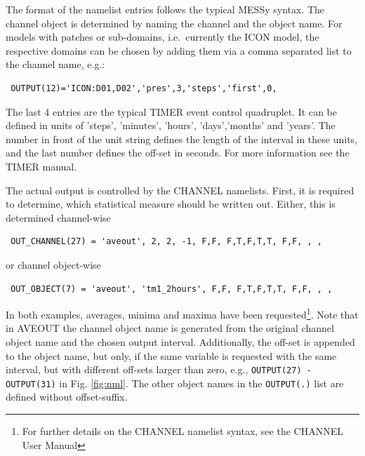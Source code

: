 \documentclass[twoside]{article}
\begin{document}
The format of the namelist entries follows the typical MESSy syntax. The
channel object is determined by naming the channel and the object name.
For  models with patches or sub-domains, i.e.\ currently the ICON model,
the respective domains can be chosen by adding them via a comma separated list
to the channel 
name, e.g.:
\begin{verbatim}
 OUTPUT(12)='ICON:D01,D02','pres',3,'steps','first',0,
\end{verbatim}

The last 4 entries are the typical TIMER event control quadruplet. It can be
defined in units of 'steps', 'minutes', 'hours', 'days','months' and
'years'. The number in front of the unit string defines the length of the
interval in these units, and the last number defines the off-set in
seconds. For more information see the TIMER manual.

The actual output is controlled by the CHANNEL namelists. First,
it is required to determine, which statistical measure should be written
out. Either, this is determined channel-wise
\begin{verbatim}
 OUT_CHANNEL(27) = 'aveout', 2, 2, -1, F,F, F,T,F,T,T, F,F, , ,
\end{verbatim}

or channel object-wise

\begin{verbatim}
 OUT_OBJECT(7) = 'aveout', 'tm1_2hours', F,F, F,T,F,T,T, F,F, , ,
\end{verbatim}

 In both examples, averages, minima and maxima have been
 requested\footnote{For further details on the CHANNEL namelist syntax, see the
 CHANNEL User Manual}. Note that in AVEOUT the channel object name is
 generated from the original channel object name and the chosen output
 interval. Additionally, the off-set is appended to the object name,
 but only, if the same variable is requested with the same interval, but with 
 different off-sets larger than zero, e.g., \verb|OUTPUT(27) - OUTPUT(31)| in
 Fig. \ref{fig:nml}. The other object names in the \verb|OUTPUT(.)|
 list are defined without offset-suffix.
\end{document}
